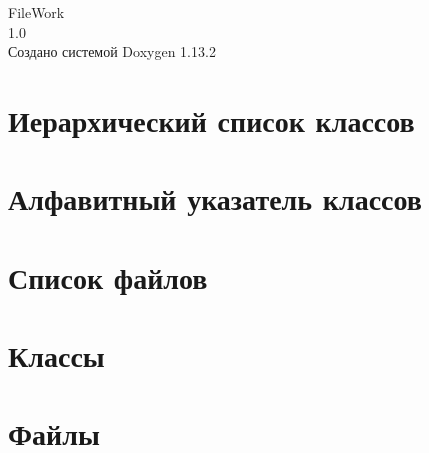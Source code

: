 \documentclass[openany]{book}
\newcommand{\+}{\discretionary{\mbox{\scriptsize$\hookleftarrow$}}{}{}}
\newcommand{\clearemptydoublepage}{%
    \newpage{\pagestyle{empty}\cleardoublepage}%
  }
\begin{document}
  \raggedbottom
    \hypersetup{pageanchor=false,
                bookmarksnumbered=true,
                pdfencoding=unicode
               }
  \begin{titlepage}
  \vspace*{7cm}
  \begin{center}%
  {\Large File\+Work}\\
  [1ex]\large 1.\+0 \\
  \vspace*{1cm}
  {\large Создано системой Doxygen 1.13.2}\\
  \end{center}
  \end{titlepage}
  \clearemptydoublepage
  \tableofcontents
  \clearemptydoublepage
  \hypersetup{pageanchor=true}

\chapter{Иерархический список классов}

\chapter{Алфавитный указатель классов}

\chapter{Список файлов}

\chapter{Классы}


\chapter{Файлы}


  \backmatter
  \newpage
  \clearemptydoublepage
  \printindex
\end{document}
